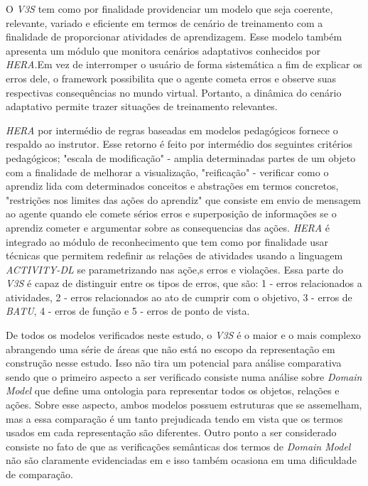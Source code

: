 O \textit{V3S} tem como por finalidade providenciar um modelo que seja coerente, relevante, variado e eficiente em termos de cenário de treinamento com a finalidade de proporcionar atividades de aprendizagem. Esse modelo também apresenta um módulo que monitora cenários adaptativos conhecidos por \textit{HERA}.Em vez de interromper o usuário de forma sistemática a fim de explicar os erros dele, o framework possibilita que o agente cometa erros e observe suas respectivas consequências no mundo virtual. Portanto, a dinâmica do cenário adaptativo permite trazer situações de treinamento relevantes. 

\textit{HERA} por intermédio de regras baseadas em modelos pedagógicos fornece o respaldo ao instrutor. Esse retorno é feito por intermédio dos seguintes critérios pedagógicos; "escala de modificação" - amplia determinadas partes de um objeto com a finalidade de melhorar a visualização, "reificação" - verificar como o aprendiz lida com determinados conceitos e abstrações em termos concretos, "restrições nos limites das ações do aprendiz" que consiste em envio de mensagem ao agente quando ele comete sérios erros e superposição de informações se o aprendiz cometer e argumentar sobre as consequencias das ações. \textit{HERA} é integrado ao módulo de reconhecimento que tem como por finalidade usar técnicas que permitem redefinir as relações de atividades usando a linguagem \textit{ACTIVITY-DL} se parametrizando nas açõe,s erros e violações. Essa parte do \textit{V3S} é capaz de distinguir entre os tipos de erros, que são: 1 - erros relacionados a atividades, 2 - erros relacionados ao ato de cumprir com o objetivo, 3 - erros de \textit{BATU}, 4 - erros de função e 5 - erros de ponto de vista.

De todos os modelos verificados neste estudo, o \textit{V3S} é o maior e o mais complexo abrangendo uma série de áreas que não está no escopo da representação em construção nesse estudo. Isso não tira um potencial para análise comparativa sendo que o primeiro aspecto a ser verificado consiste numa análise sobre \textit{Domain Model} que define uma ontologia para representar todos os objetos, relações e ações. Sobre esse aspecto, ambos modelos possuem estruturas que se assemelham, mas a essa comparação é um tanto prejudicada tendo em vista que os termos usados em cada representação são diferentes. Outro ponto a ser considerado consiste no fato de que as verificações semânticas dos termos de \textit{Domain Model} não são claramente evidenciadas em \cite{v3sframework} e isso também ocasiona em uma dificuldade de comparação. 


